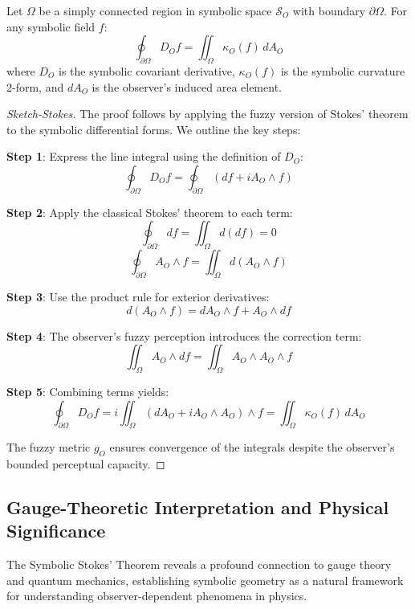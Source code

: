 \begin{theorem}
\label{theorem:bk4_symbolic_stokes}
Let $\Omega$ be a simply connected region in symbolic space $\mathcal{S}_O$ with boundary $\partial\Omega$. For any symbolic field $f$:
\[
\oint_{\partial\Omega} D_O f = \iint_\Omega \kappa_O(f) \, dA_O
\]
where $D_O$ is the symbolic covariant derivative, $\kappa_O(f)$ is the symbolic curvature 2-form, and $dA_O$ is the observer's induced area element.
\end{theorem}

\begin{proof}[Sketch-Stokes]
\label{proof:bk4_sketch_stokes}
The proof follows by applying the fuzzy version of Stokes' theorem to the symbolic differential forms. We outline the key steps:

\textbf{Step 1}: Express the line integral using the definition of $D_O$:
\[
\oint_{\partial\Omega} D_O f = \oint_{\partial\Omega} (df + i A_O \wedge f)
\]

\textbf{Step 2}: Apply the classical Stokes' theorem to each term:
\[
\oint_{\partial\Omega} df = \iint_\Omega d(df) = 0
\]
\[
\oint_{\partial\Omega} A_O \wedge f = \iint_\Omega d(A_O \wedge f)
\]

\textbf{Step 3}: Use the product rule for exterior derivatives:
\[
d(A_O \wedge f) = dA_O \wedge f + A_O \wedge df
\]

\textbf{Step 4}: The observer's fuzzy perception introduces the correction term:
\[
\iint_\Omega A_O \wedge df = \iint_\Omega A_O \wedge A_O \wedge f
\]

\textbf{Step 5}: Combining terms yields:
\[
\oint_{\partial\Omega} D_O f = i \iint_\Omega (dA_O + i A_O \wedge A_O) \wedge f = \iint_\Omega \kappa_O(f) \, dA_O
\]

The fuzzy metric $g_O$ ensures convergence of the integrals despite the observer's bounded perceptual capacity.
\end{proof}

\subsection{Gauge-Theoretic Interpretation and Physical Significance}
\label{subsec:bk4_guage_theoretic_iterpretation_and_physical_significance}

The Symbolic Stokes' Theorem reveals a profound connection to gauge theory and quantum mechanics, establishing symbolic geometry as a natural framework for understanding observer-dependent phenomena in physics.

